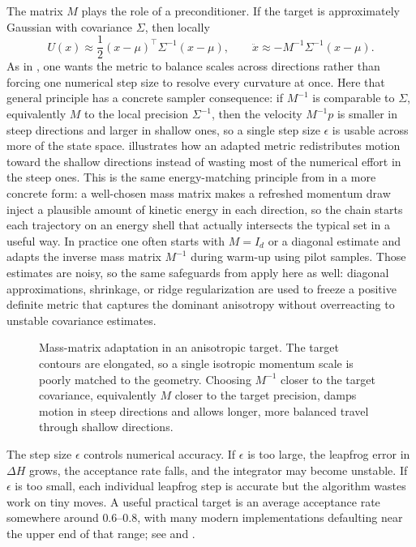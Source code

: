 The matrix $M$ plays the role of a preconditioner.
If the target is approximately Gaussian with covariance $\Sigma$, then locally
\[
  U(x) \approx \frac{1}{2}(x-\mu)^\top \Sigma^{-1}(x-\mu),
  \qquad
  \ddot x \approx -M^{-1}\Sigma^{-1}(x-\mu).
\]
As in , one wants the metric to balance scales across directions rather than forcing one numerical step size to resolve every curvature at once.
Here that general principle has a concrete sampler consequence: if $M^{-1}$ is comparable to $\Sigma$, equivalently $M$ to the local precision $\Sigma^{-1}$, then the velocity $M^{-1}p$ is smaller in steep directions and larger in shallow ones, so a single step size $\epsilon$ is usable across more of the state space.
 illustrates how an adapted metric redistributes motion toward the shallow directions instead of wasting most of the numerical effort in the steep ones.
This is the same energy-matching principle from  in a more concrete form: a well-chosen mass matrix makes a refreshed momentum draw inject a plausible amount of kinetic energy in each direction, so the chain starts each trajectory on an energy shell that actually intersects the typical set in a useful way.
In practice one often starts with $M=I_d$ or a diagonal estimate and adapts the inverse mass matrix $M^{-1}$ during warm-up using pilot samples.
Those estimates are noisy, so the same safeguards from  apply here as well: diagonal approximations, shrinkage, or ridge regularization are used to freeze a positive definite metric that captures the dominant anisotropy without overreacting to unstable covariance estimates.

\begin{figure}[H]
  \centering
  
  \caption{Mass-matrix adaptation in an anisotropic target.
  The target contours are elongated, so a single isotropic momentum scale is poorly matched to the geometry.
  Choosing $M^{-1}$ closer to the target covariance, equivalently $M$ closer to the target precision, damps motion in steep directions and allows longer, more balanced travel through shallow directions.}
  \label{fig:hmc-mass-matrix}
\end{figure}

The step size $\epsilon$ controls numerical accuracy.
If $\epsilon$ is too large, the leapfrog error in $\Delta H$ grows, the acceptance rate falls, and the integrator may become unstable.
If $\epsilon$ is too small, each individual leapfrog step is accurate but the algorithm wastes work on tiny moves.
A useful practical target is an average acceptance rate somewhere around $0.6$--$0.8$, with many modern implementations defaulting near the upper end of that range; see \citet[\S4.2]{neal_2011_hmc} and \citet[\S3.2]{hoffman_gelman_2014_nuts}.

